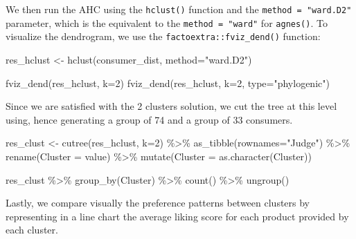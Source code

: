 \documentclass[
]{book}
\newenvironment{Shaded}{\begin{snugshade}}{\end{snugshade}}
\newcommand{\AttributeTok}[1]{\textcolor[rgb]{0.77,0.63,0.00}{#1}}
\newcommand{\DecValTok}[1]{\textcolor[rgb]{0.00,0.00,0.81}{#1}}
\newcommand{\FunctionTok}[1]{\textcolor[rgb]{0.00,0.00,0.00}{#1}}
\newcommand{\NormalTok}[1]{#1}
\newcommand{\OtherTok}[1]{\textcolor[rgb]{0.56,0.35,0.01}{#1}}
\newcommand{\SpecialCharTok}[1]{\textcolor[rgb]{0.00,0.00,0.00}{#1}}
\newcommand{\StringTok}[1]{\textcolor[rgb]{0.31,0.60,0.02}{#1}}
\begin{document}
We then run the AHC using the \texttt{hclust()} function and the \texttt{method\ =\ "ward.D2"} parameter, which is the equivalent to the \texttt{method\ =\ "ward"} for \texttt{agnes()}. To visualize the dendrogram, we use the \texttt{factoextra::fviz\_dend()} function:

\begin{Shaded}
\begin{Highlighting}[]
\NormalTok{res\_hclust }\OtherTok{\textless{}{-}} \FunctionTok{hclust}\NormalTok{(consumer\_dist, }\AttributeTok{method=}\StringTok{"ward.D2"}\NormalTok{)}

\FunctionTok{fviz\_dend}\NormalTok{(res\_hclust, }\AttributeTok{k=}\DecValTok{2}\NormalTok{)}
\FunctionTok{fviz\_dend}\NormalTok{(res\_hclust, }\AttributeTok{k=}\DecValTok{2}\NormalTok{, }\AttributeTok{type=}\StringTok{"phylogenic"}\NormalTok{)}
\end{Highlighting}
\end{Shaded}

Since we are satisfied with the 2 clusters solution, we cut the tree at this level using, hence generating a group of 74 and a group of 33 consumers.

\begin{Shaded}
\begin{Highlighting}[]
\NormalTok{res\_clust }\OtherTok{\textless{}{-}} \FunctionTok{cutree}\NormalTok{(res\_hclust, }\AttributeTok{k=}\DecValTok{2}\NormalTok{) }\SpecialCharTok{\%\textgreater{}\%} 
  \FunctionTok{as\_tibble}\NormalTok{(}\AttributeTok{rownames=}\StringTok{"Judge"}\NormalTok{) }\SpecialCharTok{\%\textgreater{}\%} 
  \FunctionTok{rename}\NormalTok{(}\AttributeTok{Cluster =}\NormalTok{ value) }\SpecialCharTok{\%\textgreater{}\%} 
  \FunctionTok{mutate}\NormalTok{(}\AttributeTok{Cluster =} \FunctionTok{as.character}\NormalTok{(Cluster))}

\NormalTok{res\_clust }\SpecialCharTok{\%\textgreater{}\%} 
  \FunctionTok{group\_by}\NormalTok{(Cluster) }\SpecialCharTok{\%\textgreater{}\%} 
  \FunctionTok{count}\NormalTok{() }\SpecialCharTok{\%\textgreater{}\%} 
  \FunctionTok{ungroup}\NormalTok{()}
\end{Highlighting}
\end{Shaded}

Lastly, we compare visually the preference patterns between clusters by representing in a line chart the average liking score for each product provided by each cluster.
\end{document}
